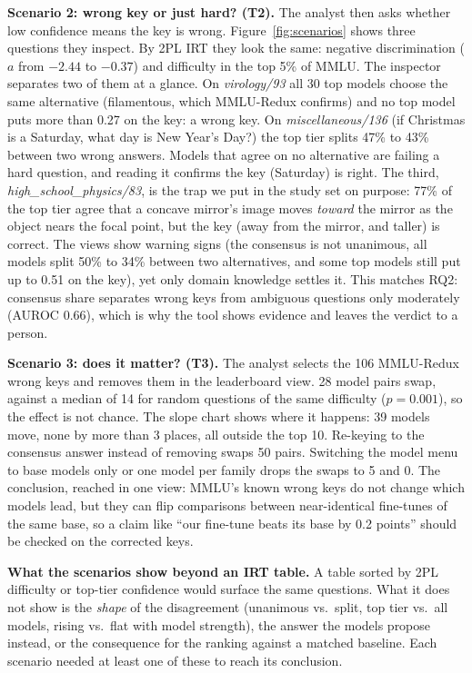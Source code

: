 \documentclass[10pt]{article}
\begin{document}
\textbf{Scenario 2: wrong key or just hard? (T2).} The analyst then asks whether low confidence means
the key is wrong. Figure~\ref{fig:scenarios} shows three questions they inspect. By 2PL IRT they look
the same: negative discrimination ($a$ from $-2.44$ to $-0.37$) and difficulty in the top 5\% of MMLU.
The inspector separates two of them at a glance. On \emph{virology/93} all 30 top models choose the
same alternative (filamentous, which MMLU-Redux confirms) and no top model puts more than 0.27 on
the key: a wrong key. On \emph{miscellaneous/136} (if Christmas is a Saturday, what day is New Year's
Day?) the top tier splits 47\% to 43\% between two wrong answers. Models that agree on no
alternative are failing a hard question, and reading it confirms the key (Saturday) is right. The
third, \emph{high\_school\_physics/83}, is the trap we put in the study set on purpose: 77\% of the
top tier agree that a concave mirror's image moves \emph{toward} the mirror as the object nears the
focal point, but the key (away from the mirror, and taller) is correct. The views show warning signs
(the consensus is not unanimous, all models split 50\% to 34\% between two alternatives, and some top
models still put up to 0.51 on the key), yet only domain knowledge settles it. This matches RQ2:
consensus share separates wrong keys from ambiguous questions only moderately (AUROC 0.66), which is
why the tool shows evidence and leaves the verdict to a person.

\textbf{Scenario 3: does it matter? (T3).} The analyst selects the 106 MMLU-Redux wrong keys and
removes them in the leaderboard view. 28 model pairs swap, against a median of 14 for random
questions of the same difficulty ($p=0.001$), so the effect is not chance. The slope chart shows
where it happens: 39 models move, none by more than 3 places, all outside the top 10. Re-keying to
the consensus answer instead of removing swaps 50 pairs. Switching the model menu to base models only
or one model per family drops the swaps to 5 and 0. The conclusion, reached in one view: MMLU's known
wrong keys do not change which models lead, but they can flip comparisons between near-identical
fine-tunes of the same base, so a claim like ``our fine-tune beats its base by 0.2 points'' should
be checked on the corrected keys.

\textbf{What the scenarios show beyond an IRT table.} A table sorted by 2PL difficulty or top-tier
confidence would surface the same questions. What it does not show is the \emph{shape} of the
disagreement (unanimous vs.\ split, top tier vs.\ all models, rising vs.\ flat with model strength),
the answer the models propose instead, or the consequence for the ranking against a matched baseline.
Each scenario needed at least one of these to reach its conclusion.
\end{document}
